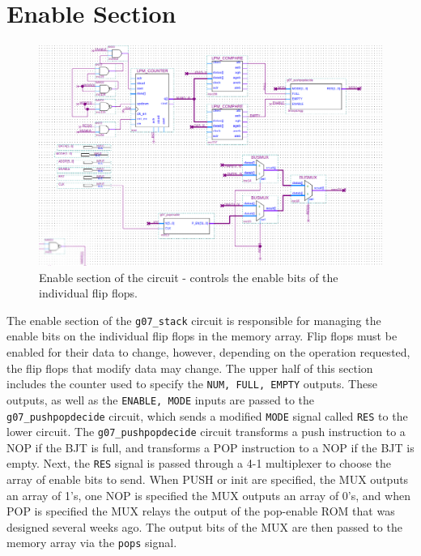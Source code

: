 \documentclass[12pt]{report}
\begin{document}
\section*{Enable Section}
\begin{figure}[h]
	\begin{center}
		\caption{Enable section of the circuit - controls the enable bits of the individual flip
		flops.}
		\includegraphics[scale=0.5]{stack1}
	\end{center}
\end{figure}
The enable section of the \texttt{g07\_stack} circuit is responsible for managing the enable bits on
the individual flip flops in the memory array. Flip flops must be enabled for their data to change,
however, depending on the operation requested, the flip flops that modify data may change. The upper
half of this section includes the counter used to specify the \texttt{NUM, FULL, EMPTY} outputs.
These outputs, as well as the \texttt{ENABLE, MODE} inputs are passed to the
\texttt{g07\_pushpopdecide} circuit, which sends a modified \texttt{MODE} signal called \texttt{RES}
to the lower circuit. The \texttt{g07\_pushpopdecide} circuit transforms a push instruction to a NOP
if the BJT is full, and transforms a POP instruction to a NOP if the BJT is empty. Next, the
\texttt{RES} signal is passed through a 4-1 multiplexer to choose the array of enable bits to send.
When PUSH or init are specified, the MUX outputs an array of 1's, one NOP is specified the MUX
outputs an array of 0's, and when POP is specified the MUX relays the output of the pop-enable ROM
that was designed several weeks ago. The output bits of the MUX are then passed to the memory array
via the \texttt{pops} signal.
\end{document}
